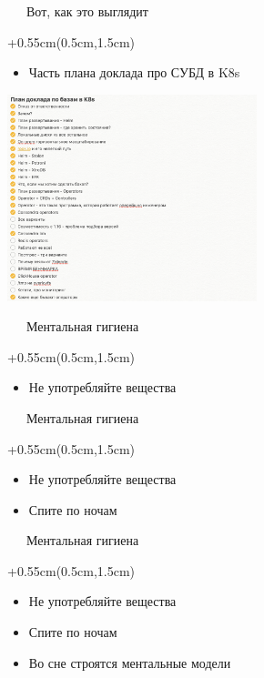 \documentclass[xetex,18pt,aspectratio=169]{beamer}
\begin{document}
\begin{Large}
\begin{frame}{\ \ \ Вот, как это выглядит}
\begin{textblock*}{\framewidth+0.55cm}(0.5cm,1.5cm)
\begin{itemize}
  \item Часть плана доклада про СУБД в K8s
\end{itemize}
\begin{minipage}{\textwidth}
  \centering
  \includegraphics[height=6.0cm]{img/microplan}
\end{minipage}
\end{textblock*}
\end{frame}

\begin{frame}{\ \ \ Ментальная гигиена}
\begin{textblock*}{\framewidth+0.55cm}(0.5cm,1.5cm)
\begin{itemize}
  \item Не употребляйте вещества
\end{itemize}
\end{textblock*}
\end{frame}

\begin{frame}{\ \ \ Ментальная гигиена}
\begin{textblock*}{\framewidth+0.55cm}(0.5cm,1.5cm)
\begin{itemize}
  \item Не употребляйте вещества
  \item Спите по ночам
\end{itemize}
\end{textblock*}
\end{frame}

\begin{frame}{\ \ \ Ментальная гигиена}
\begin{textblock*}{\framewidth+0.55cm}(0.5cm,1.5cm)
\begin{itemize}
  \item Не употребляйте вещества
  \item Спите по ночам
  \item Во сне строятся ментальные модели
\end{itemize}
\end{textblock*}
\end{frame}


\end{Large}
\end{document}
